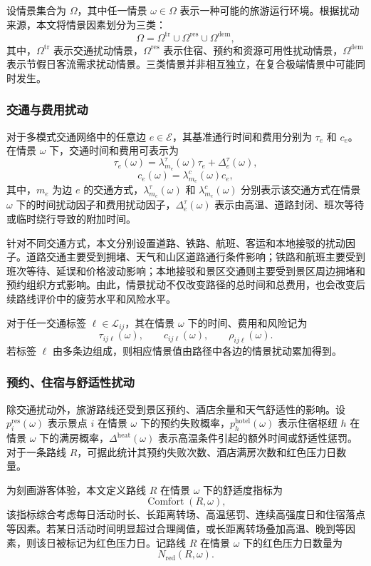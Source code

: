 \documentclass[UTF8,zihao=-4,a4paper]{ctexart}
\begin{document}
设情景集合为 $\Omega$，其中任一情景 $\omega\in\Omega$ 表示一种可能的旅游运行环境。根据扰动来源，本文将情景因素划分为三类：
\[
\Omega
=
\Omega^{\mathrm{tr}}
\cup
\Omega^{\mathrm{res}}
\cup
\Omega^{\mathrm{dem}},
\]
其中，$\Omega^{\mathrm{tr}}$ 表示交通扰动情景，$\Omega^{\mathrm{res}}$ 表示住宿、预约和资源可用性扰动情景，$\Omega^{\mathrm{dem}}$ 表示节假日客流需求扰动情景。三类情景并非相互独立，在复合极端情景中可能同时发生。

\subsubsection{交通与费用扰动}

对于多模式交通网络中的任意边 $e\in\mathcal{E}$，其基准通行时间和费用分别为 $\tau_e$ 和 $c_e$。在情景 $\omega$ 下，交通时间和费用可表示为
\[
\tau_e(\omega)
=
\lambda^{\tau}_{m_e}(\omega)\tau_e
+
\Delta^{\tau}_e(\omega),
\]
\[
c_e(\omega)
=
\lambda^{c}_{m_e}(\omega)c_e,
\]
其中，$m_e$ 为边 $e$ 的交通方式，$\lambda^{\tau}_{m_e}(\omega)$ 和 $\lambda^{c}_{m_e}(\omega)$ 分别表示该交通方式在情景 $\omega$ 下的时间扰动因子和费用扰动因子，$\Delta^{\tau}_e(\omega)$ 表示由高温、道路封闭、班次等待或临时绕行导致的附加时间。

针对不同交通方式，本文分别设置道路、铁路、航班、客运和本地接驳的扰动因子。道路交通主要受到拥堵、天气和山区道路通行条件影响；铁路和航班主要受到班次等待、延误和价格波动影响；本地接驳和景区交通则主要受到景区周边拥堵和预约组织方式影响。由此，情景扰动不仅改变路径的总时间和总费用，也会改变后续路线评价中的疲劳水平和风险水平。

对于任一交通标签 $\ell\in\mathcal{L}_{ij}$，其在情景 $\omega$ 下的时间、费用和风险记为
\[
\tau_{ij\ell}(\omega),\qquad
c_{ij\ell}(\omega),\qquad
\rho_{ij\ell}(\omega).
\]
若标签 $\ell$ 由多条边组成，则相应情景值由路径中各边的情景扰动累加得到。

\subsubsection{预约、住宿与舒适性扰动}

除交通扰动外，旅游路线还受到景区预约、酒店余量和天气舒适性的影响。设 $p_i^{\mathrm{res}}(\omega)$ 表示景点 $i$ 在情景 $\omega$ 下的预约失败概率，$p_h^{\mathrm{hotel}}(\omega)$ 表示住宿枢纽 $h$ 在情景 $\omega$ 下的满房概率，$\Delta^{\mathrm{heat}}(\omega)$ 表示高温条件引起的额外时间或舒适性惩罚。对于一条路线 $R$，可据此统计其预约失败次数、酒店满房次数和红色压力日数量。

为刻画游客体验，本文定义路线 $R$ 在情景 $\omega$ 下的舒适度指标为
\[
\operatorname{Comfort}(R,\omega),
\]
该指标综合考虑每日活动时长、长距离转场、高温惩罚、连续高强度日和住宿落点等因素。若某日活动时间明显超过合理阈值，或长距离转场叠加高温、晚到等因素，则该日被标记为红色压力日。记路线 $R$ 在情景 $\omega$ 下的红色压力日数量为
\[
N_{\mathrm{red}}(R,\omega).
\]
\end{document}

